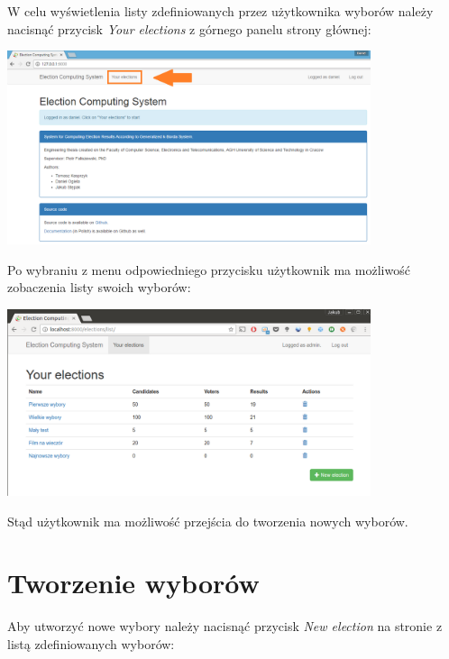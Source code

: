 \documentclass[pdflatex,11pt]{../aghdoc_version2}
\begin{document}
W celu wyświetlenia listy zdefiniowanych przez użytkownika wyborów należy nacisnąć przycisk \textit{Your elections} z górnego panelu strony głównej: \\

\begin{center}
\includegraphics[width=0.8\textwidth]{pics/your_elections_button.png}
\end{center}

\vspace{\baselineskip}
Po wybraniu z menu odpowiedniego przycisku użytkownik ma możliwość zobaczenia listy swoich wyborów: \\

\begin{center}
\includegraphics[width=0.8\textwidth]{pics/elections-list.png}
\end{center}

Stąd użytkownik ma możliwość przejścia do tworzenia nowych wyborów.


\section{Tworzenie wyborów}
\label{sec:electionscreate}


Aby utworzyć nowe wybory należy nacisnąć przycisk \textit{New election} na stronie z listą zdefiniowanych wyborów: \\
\end{document}
